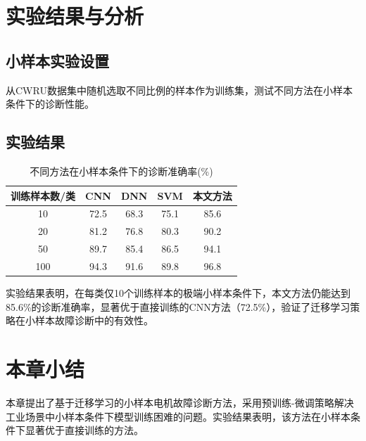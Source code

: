\section{实验结果与分析}

\subsection{小样本实验设置}

从CWRU数据集中随机选取不同比例的样本作为训练集，测试不同方法在小样本条件下的诊断性能。

\subsection{实验结果}

\begin{table}[htbp]
	\centering
	\caption{不同方法在小样本条件下的诊断准确率(\%)}
	\label{tab:transfer_results}
	\begin{tabular}{ccccc}
		\toprule
		训练样本数/类 & CNN & DNN & SVM & 本文方法 \\
		\midrule
		10 & 72.5 & 68.3 & 75.1 & 85.6 \\
		20 & 81.2 & 76.8 & 80.3 & 90.2 \\
		50 & 89.7 & 85.4 & 86.5 & 94.1 \\
		100 & 94.3 & 91.6 & 89.8 & 96.8 \\
		\bottomrule
	\end{tabular}
\end{table}

实验结果表明，在每类仅10个训练样本的极端小样本条件下，本文方法仍能达到85.6\%的诊断准确率，显著优于直接训练的CNN方法（72.5\%），验证了迁移学习策略在小样本故障诊断中的有效性。

\section{本章小结}

本章提出了基于迁移学习的小样本电机故障诊断方法，采用预训练-微调策略解决工业场景中小样本条件下模型训练困难的问题。实验结果表明，该方法在小样本条件下显著优于直接训练的方法。